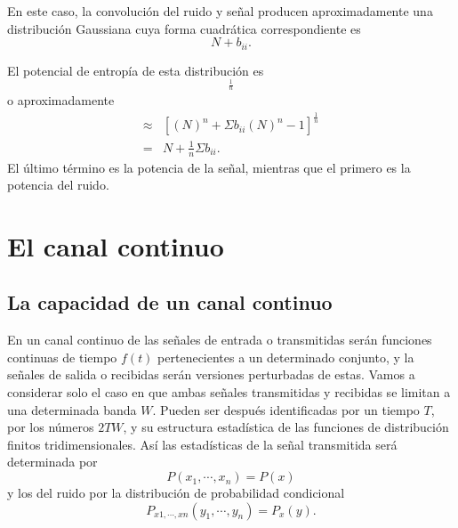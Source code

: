 En este caso, la convoluci\'on del ruido y se\~nal producen
aproximadamente una distribuci\'on Gaussiana cuya forma cuadr\'atica
correspondiente es 
\begin{equation} 
N + b_{ii}.  
\end{equation}
	
El potencial de entrop\'ia de esta distribuci\'on es 
\begin{equation}
  [\Pi(N + b_{ii})]^\frac{1}{n} 
\end{equation} 
o aproximadamente 
\begin{equation} 
\begin{array}{cl}
\approx& [(N)^n + \Sigma b_{ii}(N)^n-1]^\frac{1}{n} \\
=& N + \frac{1}{n}\Sigma b_{ii}.
\end{array} 
\end{equation} 
El \'ultimo t\'ermino es la potencia de la se\~nal, mientras que el
primero es la potencia del ruido.
	
\clearpage
	
\part{El canal continuo}
\label{part:4}
	
\chapter{La capacidad de un canal continuo}	
\label{sec:24}
	
En un canal continuo de las se\~nales de entrada o transmitidas
ser\'an funciones continuas de tiempo $f(t)$ pertenecientes a un
determinado conjunto, y la señales de salida o recibidas ser\'an
versiones perturbadas de estas. Vamos a considerar solo el caso en que
ambas se\~nales transmitidas y recibidas se limitan a una determinada
banda $W$. Pueden ser despu\'es identificadas por un tiempo $T$, por
los n\'umeros $2TW$, y su estructura estad\'istica de las funciones de
distribuci\'on finitos tridimensionales. As\'i las estad\'isticas de
la se\~nal transmitida ser\'a determinada por
\begin{equation}
P(x_{1}, \cdots ,x_{n}) = P(x)
\end{equation}	 
y los del ruido por la distribuci\'on de probabilidad condicional
\begin{equation}
P_{x1, \cdots ,xn} (y_{1}, \cdots ,y_{n}) = P_{x}(y).
\end{equation}
	
